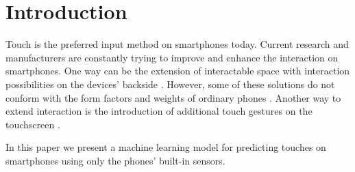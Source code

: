 \section{Introduction}
Touch is the preferred input method on smartphones today. 
Current research and manufacturers are constantly trying to improve and enhance the interaction on smartphones. 
One way can be the extension of interactable space with interaction possibilities on the devices' backside \cite{Yoo,Le2016,Baudisch2009,Le2017}.
However, some of these solutions do not conform with the form factors and weights of ordinary phones \cite{Corsten2017,DeLuca2013,Shen,Wolf2012}.
Another way to extend interaction is the introduction of additional touch gestures on the touchscreen \cite{Le:2018:PalmTouch}.


In this paper we present a machine learning model for predicting touches on smartphones using only the phones' built-in sensors.



